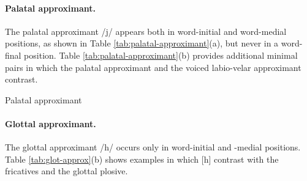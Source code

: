 \newpage 
\paragraph{Palatal approximant.}
The palatal approximant /{j}/  appears both in word-initial and word-medial
positions, as shown in Table  \ref{tab:palatal-approximant}(a),   but never in a
word-final position.   Table \ref{tab:palatal-approximant}(b) provides additional minimal pairs in which the
palatal approximant and the voiced labio-velar approximant contrast.

 
\begin{table} 

\caption{Palatal approximant\label{tab:palatal-approximant}}
\quad
{}


\end{table}



\paragraph{Glottal approximant.}
\label{sec:glot-approx}

The glottal approximant   /{h}/  
occurs only in word-initial and -medial positions.
Table \ref{tab:glot-approx}(b) shows examples in which [{h}]
contrast with the fricatives and the glottal plosive.


